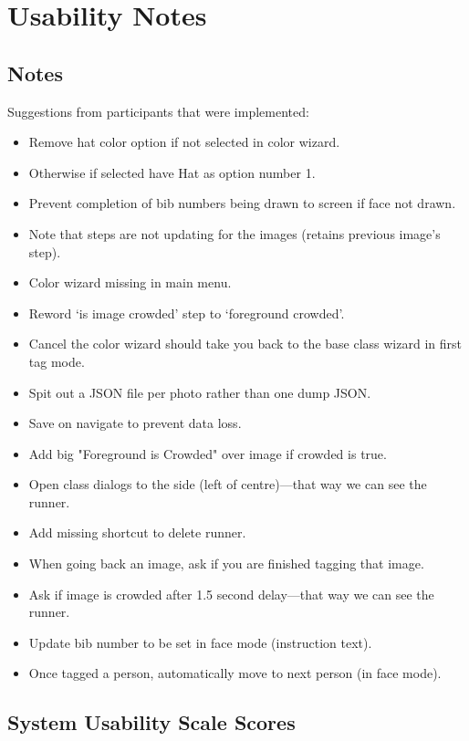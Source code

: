 \chapter{Usability Notes}
\label{ch:usability}

\section{Notes}

Suggestions from participants that were implemented:

\begin{itemize}
  \itemsep-0.5em
  \item{Remove hat color option if not selected in color wizard.}
  \item{Otherwise if selected have Hat as option number 1.}
  \item{Prevent completion of bib numbers being drawn to screen if face not drawn.}
  \item{Note that steps are not updating for the images (retains previous image's step).}
  \item{Color wizard missing in main menu.}
  \item{Reword `is image crowded' step to `foreground crowded'.}
  \item{Cancel the color wizard should take you back to the base class wizard in first tag mode.}
  \item{Spit out a JSON file per photo rather than one dump JSON.}
  \item{Save on navigate to prevent data loss.}
  \item{Add big "Foreground is Crowded" over image if crowded is true.}
  \item{Open class dialogs to the side (left of centre)---that way we can see the runner.}
  \item{Add missing shortcut to delete runner.}
  \item{When going back an image, ask if you are finished tagging that image.}
  \item{Ask if image is crowded after 1.5 second delay---that way we can see the runner.}
  \item{Update bib number to be set in face mode (instruction text).}
  \item{Once tagged a person, automatically move to next person (in face mode).}
\end{itemize}

\clearpage
\section{System Usability Scale Scores}

